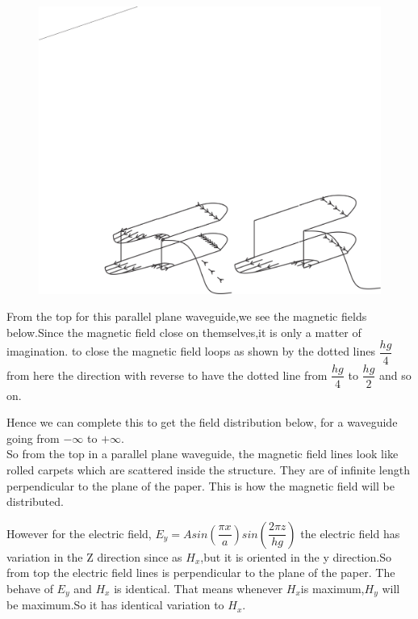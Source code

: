 \begin{figure}[h]
\centering
\includegraphics[width=1\linewidth]{./graphics/WATSON}
\caption{}
 \end{figure}
 From the top for this parallel plane waveguide,we see the magnetic fields below.Since the magnetic field close on themselves,it is only a matter of imagination.
to close the magnetic field loops as shown by the dotted lines ${\dfrac{hg}{4}}$ from here the direction with reverse to have the dotted line from $\dfrac{hg}{4}$  to $\dfrac{hg}{2}$ and so on.

Hence we can complete this to get the field distribution below, for a waveguide going from ${-\infty}$ to ${+\infty}$.\\
So from the top in a parallel plane waveguide, the magnetic field lines look like rolled carpets which are scattered inside the structure. They are of infinite length perpendicular to the plane of the paper. This is how the magnetic field will be distributed.

However for the electric field, ${E_y= Asin(\dfrac{\pi x}{a})sin(\dfrac{2\pi z}{hg})}$ the electric field has variation in the Z direction since as ${H_x}$,but it is oriented in the y direction.So from top the electric field lines is perpendicular to the plane of the paper. The behave of ${E_y}$ and ${H_x}$ is identical. That means whenever ${H_x}$is maximum,${H_y}$ will be maximum.So it has identical variation to ${H_x}$.


